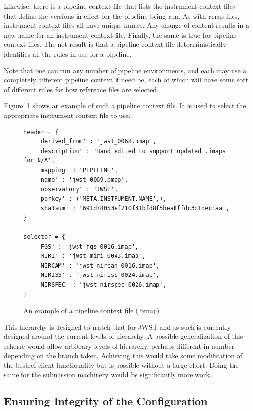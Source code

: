 \documentclass[final,authoryear,5p,times,twocolumn]{elsarticle}
\begin{document}
Likewise, there is a pipeline context file that lists the instrument context
files that define the versions in effect for the pipeline being run. As with
rmap files, instrument context files all have unique names. Any change of
content results in a new name for an instrument context file. Finally, the same
is true for pipeline context files. The net result is that a pipeline context
file deterministically identifies all the rules in use for a pipeline. 

Note that one can run any number of pipeline environments, and each may use a
completely different pipeline context if need be, each of which will have some
sort of different rules for how reference files are selected.

Figure~\ref{fig:example_pipeline_context} shows an example of such a pipeline context file.
It is used to select the appropriate instrument context file to use.

\begin{figure}
\begin{verbatim}
header = {
    'derived_from' : 'jwst_0068.pmap',
    'description' : 'Hand edited to support updated .imaps for N/A',
    'mapping' : 'PIPELINE',
    'name' : 'jwst_0069.pmap',
    'observatory' : 'JWST',
    'parkey' : ('META.INSTRUMENT.NAME',),
    'sha1sum' : '691d78053ef710f31bfd8f5bea8ffdc3c1dec1aa',
}

selector = {
    'FGS' : 'jwst_fgs_0016.imap',
    'MIRI' : 'jwst_miri_0043.imap',
    'NIRCAM' : 'jwst_nircam_0016.imap',
    'NIRISS' : 'jwst_niriss_0024.imap',
    'NIRSPEC' : 'jwst_nirspec_0026.imap',
}
\end{verbatim}
\caption{An example of a pipeline context file (.pmap)}
\label{fig:example_pipeline_context}
\end{figure}


This hierarchy is designed to match that for JWST and as such is currently
designed around the current levels of hierarchy. A possible generalization
of this scheme would allow arbitrary levels of hierarchy, perhaps
different in number depending on the branch taken. Achieving this would
take some modification of the bestref client functionality but is possible
without a large effort. Doing the same for the submission machinery would 
be significantly more work. 

\subsection{Ensuring Integrity of the Configuration}
\end{document}
